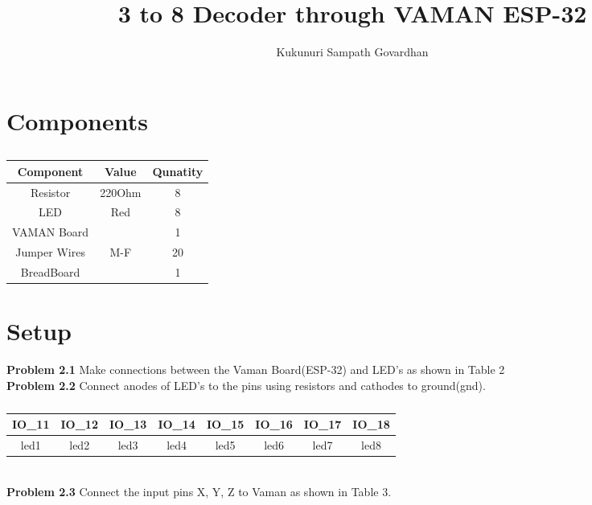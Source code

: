 \documentclass[journal,12pt,twocolumn]{IEEEtran}
\title{
3 to 8 Decoder through VAMAN ESP-32
}
\author{Kukunuri Sampath Govardhan}
\begin{document}
\maketitle
\tableofcontents
\section{Components}
\begin{table}[h]
    \centering
    \begin{tabular}{| c | c | c |}
       \hline
       \textbf{Component}  &  \textbf{Value}  &  \textbf{Qunatity}\\
       \hline
         Resistor  &  220Ohm  &  8  \\
         \hline
         LED  &  Red  &  8  \\
         \hline
         VAMAN Board  &  & 1  \\
         \hline
         Jumper Wires  &  M-F  &  20  \\
         \hline
         BreadBoard  &    &  1\\
         \hline
         
    \end{tabular}
    \caption{}
    \label{tab:my_label}
\end{table}
\section{Setup}
\textbf{Problem 2.1} Make connections between the Vaman Board(ESP-32) and LED's as shown in Table 2 \\

\textbf{Problem 2.2} Connect anodes of LED's to the pins using resistors and cathodes to ground(gnd).\\
\begin{table}[h]
    \centering
    \begin{tabular}{| c | c | c | c | c | c | c | c |}
        \hline
         IO\_11 & IO\_12 & IO\_13 & IO\_14 & IO\_15 & IO\_16 & IO\_17 & IO\_18    \\
       \hline
       led1 & led2 & led3 & led4 & led5 & led6 & led7 & led8  \\
         \hline
    \end{tabular}
    \caption{}
    \label{tab:my_label}
\end{table}
\\
\textbf{Problem 2.3} Connect the input pins X, Y, Z to Vaman as shown in Table 3.\\
\end{document}
